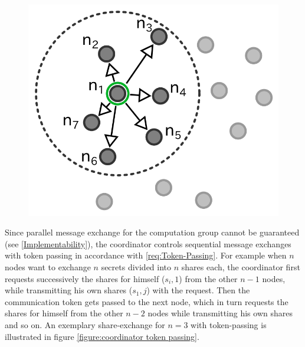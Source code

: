 \begin{figure}[!htb]
{		\includegraphics[scale=1.0]{figures/coordinator-5.png}
		\label{figure:Formation of fully meshed computation group - e}
	}%
	\hfill
\end{figure}

Since parallel message exchange for the computation group cannot be guaranteed (see \ref{Implementability}), the coordinator controls sequential message exchanges with token passing in accordance with \ref{req:Token-Passing}. For example when $n$ nodes want to exchange $n$ secrets divided into $n$ shares each, the coordinator first requests successively the shares for himself ($s_i,1$) from the other $n-1$ nodes, while transmitting his own shares ($s_1,j$) with the request. Then the communication token gets passed to the next node, which in turn requests the shares for himself from the other $n-2$ nodes while transmitting his own shares and so on. An exemplary share-exchange for $n=3$ with token-passing is illustrated in figure \ref{figure:coordinator token passing}.


